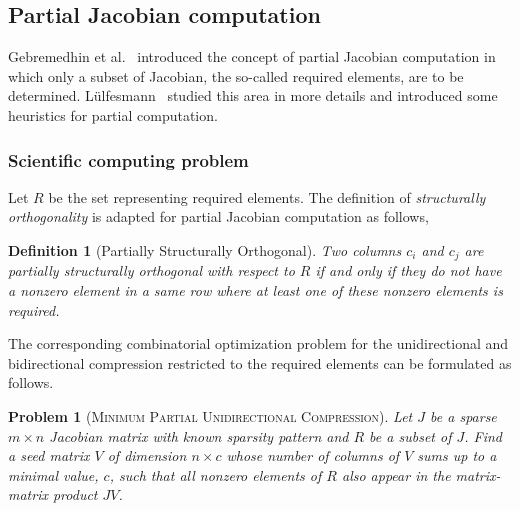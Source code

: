 \documentclass[12pt, twoside,a4paper,toc=bibliography]{scrbook}
\newtheorem{problem}{Problem}
\newtheorem{definition}{Definition}
\newcommand{\col}{\ensuremath{c}}
\newcommand{\MinStaBic}{\textsc{Minimum Star Bicoloring}}
\newcommand{\MinBidCom}{\textsc{Minimum Bidirectional Compression}}
\newcommand{\MinRUniCom}{\textsc{Minimum Partial Unidirectional Compression}}
\begin{document}
\subsection{Partial Jacobian computation}
\label{s.part.jac}
Gebremedhin et al.~\cite{Gebremedhin05whatcolor} introduced the concept of partial Jacobian computation
in which only a subset of Jacobian, the so-called required elements,
are to be determined.
L{\"u}lfesmann~\cite{Lulfesmann2012Fap} studied this area in more details and
introduced some heuristics for partial computation.
\subsubsection{Scientific computing problem}
\label{ss.problem.part}
Let $R$ be the set representing required elements. 
The definition of
\emph{structurally orthogonality} is adapted for partial Jacobian computation as follows,
\begin{definition}[Partially Structurally Orthogonal]\label{d.part.str.orth}
Two columns $c_i$ and $c_j$ are partially structurally orthogonal with respect to $R$
if and only if they do not have a nonzero element in a same row where at least
one of these nonzero elements is required.
\end{definition}

The corresponding combinatorial optimization problem for the unidirectional and bidirectional 
compression restricted to the required elements
can be formulated as follows.
\begin{problem}[\MinRUniCom]
\label{p.seed.runi} Let $J$ be a sparse ${m\times n}$ Jacobian matrix with known sparsity
pattern and $R$ be a subset of $J$. Find a seed matrix $V$ of dimension $n\times \col$
whose number of columns of $V$ sums up
to a minimal value, $\col$, such that all nonzero elements of $R$ also appear in
the matrix-matrix product $JV$.
\end{problem}
\end{document}
